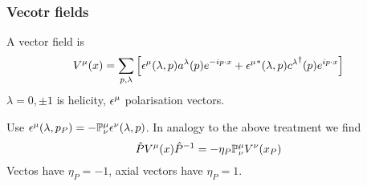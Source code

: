 \documentclass{article}
\begin{document}
\subsubsection*{Vecotr fields}
\begin{definition}
A vector field is 
\[
V^\mu(x) = \sum_{p,\lambda} \left[ \epsilon^\mu(\lambda,p) a^\lambda(p) e^{-ip\cdot x} +{\epsilon^\mu}^\ast(\lambda,p) {c^\lambda}^\dagger(p) e^{ip\cdot x} \right]
\]
$\lambda = 0, \pm1$ is helicity, $\epsilon^\mu$ polarisation vectors. 
\end{definition}
Use $\epsilon^\mu(\lambda, p_P) = -\mathbb{P}^\mu_\nu \epsilon^\nu (\lambda,p)$. In analogy to the above treatment we find 
\[
\hat{P} V^\mu(x) \hat{P}^{-1} = -\eta_P \mathbb{P}^\mu_\nu V^\nu(x_P)
\]
Vectos have $\eta_P = -1$, axial vectors have $\eta_P = 1$. \\
\end{document}
